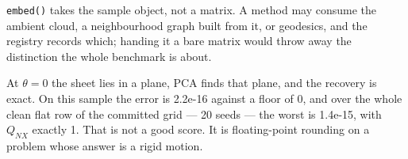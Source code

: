 \documentclass[
  british,
  a4paper,
]{book}
\newenvironment{Shaded}{\begin{snugshade}}{\end{snugshade}}
\newcommand{\AttributeTok}[1]{\textcolor[rgb]{0.13,0.29,0.53}{#1}}
\newcommand{\CommentTok}[1]{\textcolor[rgb]{0.56,0.35,0.01}{\textit{#1}}}
\newcommand{\ConstantTok}[1]{\textcolor[rgb]{0.56,0.35,0.01}{#1}}
\newcommand{\ControlFlowTok}[1]{\textcolor[rgb]{0.13,0.29,0.53}{\textbf{#1}}}
\newcommand{\DecValTok}[1]{\textcolor[rgb]{0.00,0.00,0.81}{#1}}
\newcommand{\FunctionTok}[1]{\textcolor[rgb]{0.13,0.29,0.53}{\textbf{#1}}}
\newcommand{\NormalTok}[1]{#1}
\newcommand{\OtherTok}[1]{\textcolor[rgb]{0.56,0.35,0.01}{#1}}
\newcommand{\SpecialCharTok}[1]{\textcolor[rgb]{0.81,0.36,0.00}{\textbf{#1}}}
\newcommand{\StringTok}[1]{\textcolor[rgb]{0.31,0.60,0.02}{#1}}
\newcounter{none} %
\begin{document}
\texttt{embed()} takes the sample object, not a matrix. A method may consume the ambient
cloud, a neighbourhood graph built from it, or geodesics, and the registry
records which; handing it a bare matrix would throw away the distinction the
whole benchmark is about.

\begin{Shaded}
\end{Shaded}

At \(\theta = 0\) the sheet lies in a plane, PCA finds that plane, and the recovery
is exact. On this sample the error is
2.2e-16 against a floor of 0,
and over the whole clean flat row of the committed grid --- 20
seeds --- the worst is
1.4e-15, with
\(Q_{NX}\) exactly 1. That is not a good score. It is
floating-point rounding on a problem whose answer is a rigid motion.
\end{document}
